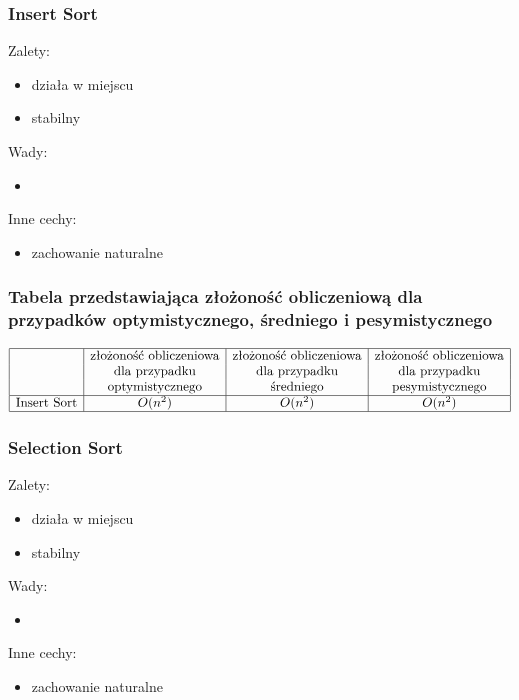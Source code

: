 \documentclass[polish,polish,a4paper]{article}
\begin{document}
\begin{spacing}{1.5}
	\subsubsection*{Insert Sort}
	Zalety:
	\begin{itemize}
		\item działa w miejscu
		\item stabilny 
	\end{itemize}
	Wady:
	\begin{itemize}
		\item 
	\end{itemize}
	Inne cechy:
	\begin{itemize}
		\item zachowanie naturalne
	\end{itemize}
	
	
	\subsubsection*{Tabela przedstawiająca złożoność obliczeniową dla przypadków optymistycznego, średniego i pesymistycznego} 
	\begin{equation*}
	\begin{array}{|l|c|c|c|}
	\hline
	&$złożoność obliczeniowa$&$złożoność obliczeniowa$&$złożoność obliczeniowa$\\
	&$dla przypadku$&$dla przypadku$&$dla przypadku$\\
	&$optymistycznego$&$średniego$&$pesymistycznego$\\
	\hline
	$Insert Sort$&O(n^2)&O(n^2)&O(n^2)\\
	\hline
	\end{array}
	\end{equation*}
		
		\subsubsection*{Selection Sort}
	Zalety:
	\begin{itemize}
		\item działa w miejscu
		\item stabilny 
	\end{itemize}
	Wady:
	\begin{itemize}
		\item 
	\end{itemize}
	Inne cechy:
	\begin{itemize}
		\item zachowanie naturalne
	\end{itemize}
	

\end{spacing}
\end{document}
